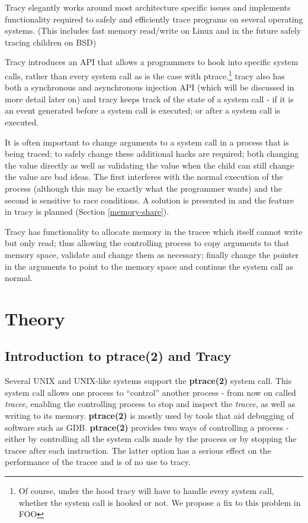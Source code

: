 \documentclass[a4paper, 10pt]{report}
\begin{document}
Tracy elegantly works around most architecture specific issues and implements
functionality required to safely and efficiently trace programs on several
operating systems. (This includes fast memory read/write on Linux
and in the future safely tracing children on BSD)

Tracy introduces an API that allows a programmers to hook into specific system
calls, rather than every system call as is the case with ptrace.\footnote{Of
course, under the hood tracy will have to handle every system call, whether
the system call is hooked or not. We propose a fix to this problem in FOO}%
tracy also has both a synchronous and asynchronous injection API (which
will be discussed in more detail later on) and tracy keeps track of the state of
a system call - if it is an event generated before a system call is executed; or
after a system call is executed.

It is often important to change arguments to a system call in a process that is
being traced; to safely change these additional hacks are required;
both changing the value directly as well as validating the value when the child
can still change the value are bad ideas.
The first interferes with the normal execution of the process
(although this may be exactly what the programmer wants) and the second is
sensitive to race conditions. A solution is presented in
\cite{Noordende_asecure} and the feature in tracy is planned (Section
\ref{memory-share}).

Tracy has functionality to allocate memory in the
tracee which itself cannot write but only read; thus allowing the controlling
process to copy arguments to that memory space, validate and change them as
necessary; finally change the pointer in the arguments to point to the memory
space and continue the system call as normal.

\chapter{Theory}

\section{Introduction to ptrace(2) and Tracy}

Several UNIX and UNIX-like systems support the \textbf{ptrace(2)} system call.
This system call allows one process to ``control'' another process - from now on
called \textit{tracee}, enabling the controlling process to stop and inspect
the \textit{tracee}, as well as writing to its memory. \textbf{ptrace(2)} is
mostly used by tools that aid debugging of software such as GDB\cite{gdb}.
\textbf{ptrace(2)} provides two ways of controlling a process
- either by controlling all the system calls made by the process or by stopping
the tracee after each instruction. The latter option has a serious effect on the
performance of the tracee and is of no use to tracy.
\end{document}
